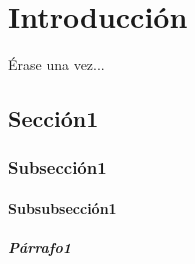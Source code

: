 
\chapter{Introducción} \label{cap.introduccion}
Érase una vez... \cite{Nobody06}
\section{Sección1}
\blindtext[3]
\subsection{Subsección1}
\blindtext[3]
\subsubsection{Subsubsección1}
\blindtext[10]
\paragraph{Párrafo1}
\blindtext[3]
